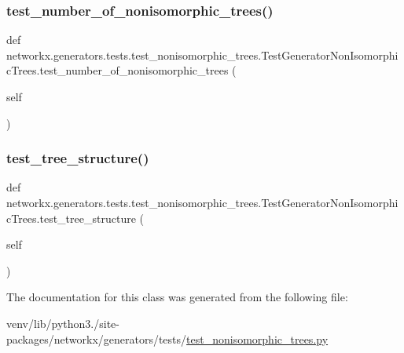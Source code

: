 \subsubsection{\texorpdfstring{test\+\_\+number\+\_\+of\+\_\+nonisomorphic\+\_\+trees()}{test\_number\_of\_nonisomorphic\_trees()}}
{\footnotesize\ttfamily def networkx.\+generators.\+tests.\+test\+\_\+nonisomorphic\+\_\+trees.\+Test\+Generator\+Non\+Isomorphic\+Trees.\+test\+\_\+number\+\_\+of\+\_\+nonisomorphic\+\_\+trees (\begin{DoxyParamCaption}\item[{}]{self }\end{DoxyParamCaption})}

\mbox{\label{classnetworkx_1_1generators_1_1tests_1_1test__nonisomorphic__trees_1_1TestGeneratorNonIsomorphicTrees_af25306b2e1411c8a23470c064145f217}} 
\subsubsection{\texorpdfstring{test\+\_\+tree\+\_\+structure()}{test\_tree\_structure()}}
{\footnotesize\ttfamily def networkx.\+generators.\+tests.\+test\+\_\+nonisomorphic\+\_\+trees.\+Test\+Generator\+Non\+Isomorphic\+Trees.\+test\+\_\+tree\+\_\+structure (\begin{DoxyParamCaption}\item[{}]{self }\end{DoxyParamCaption})}



The documentation for this class was generated from the following file\+:\begin{DoxyCompactItemize}
\item 
venv/lib/python3./site-\/packages/networkx/generators/tests/\hyperlink{test__nonisomorphic__trees_8py}{test\+\_\+nonisomorphic\+\_\+trees.\+py}\end{DoxyCompactItemize}
